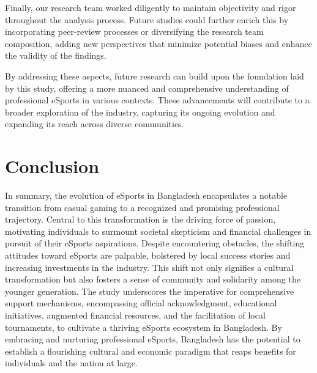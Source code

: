 \documentclass[manuscript,screen,review,anonymous]{acmart}
\begin{document}
Finally, our research team worked diligently to maintain objectivity and rigor throughout the analysis process. Future studies could further enrich this by incorporating peer-review processes or diversifying the research team composition, adding new perspectives that minimize potential biases and enhance the validity of the findings.

By addressing these aspects, future research can build upon the foundation laid by this study, offering a more nuanced and comprehensive understanding of professional eSports in various contexts. These advancements will contribute to a broader exploration of the industry, capturing its ongoing evolution and expanding its reach across diverse communities.

\section{Conclusion}

In summary, the evolution of eSports in Bangladesh encapsulates a notable transition from casual gaming to a recognized and promising professional trajectory. Central to this transformation is the driving force of passion, motivating individuals to surmount societal skepticism and financial challenges in pursuit of their eSports aspirations. Despite encountering obstacles, the shifting attitudes toward eSports are palpable, bolstered by local success stories and increasing investments in the industry. This shift not only signifies a cultural transformation but also fosters a sense of community and solidarity among the younger generation. The study underscores the imperative for comprehensive support mechanisms, encompassing official acknowledgment, educational initiatives, augmented financial resources, and the facilitation of local tournaments, to cultivate a thriving eSports ecosystem in Bangladesh. By embracing and nurturing professional eSports, Bangladesh has the potential to establish a flourishing cultural and economic paradigm that reaps benefits for individuals and the nation at large.

\end{document}
